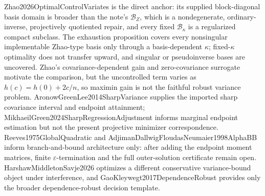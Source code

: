 Zhao2026OptimalControlVariates is the direct anchor: its supplied block-diagonal basis domain is broader than the note's \(\mathcal B_Z\), which is a nondegenerate, ordinary-inverse, projectively quotiented repair, and every fixed \(\mathcal B_\kappa\) is a regularized compact subclass.  The exhaustion proposition covers every nonsingular implementable Zhao-type basis only through a basis-dependent \(\kappa\); fixed-\(\kappa\) optimality does not transfer upward, and singular or pseudoinverse bases are uncovered.  Zhao's covariance-dependent gain and zero-covariance surrogate motivate the comparison, but the uncontrolled term varies as \(h(c)=h(0)+2c/n\), so maximin gain is not the faithful robust variance problem.  AronowGreenLee2014SharpVariance supplies the imported sharp covariance interval and endpoint attainment; MikhaeilGreen2024SharpRegressionAdjustment informs marginal endpoint estimation but not the present projective minimizer correspondence.  Reeves1975GlobalQuadratic and AdjimanDallwigFloudasNeumaier1998AlphaBB inform branch-and-bound architecture only: after adding the endpoint moment matrices, finite \(\varepsilon\)-termination and the full outer-solution certificate remain open.  HarshawMiddletonSavje2026 optimizes a different conservative variance-bound object under interference, and GaoKleywegt2017DependenceRobust provides only the broader dependence-robust decision template.